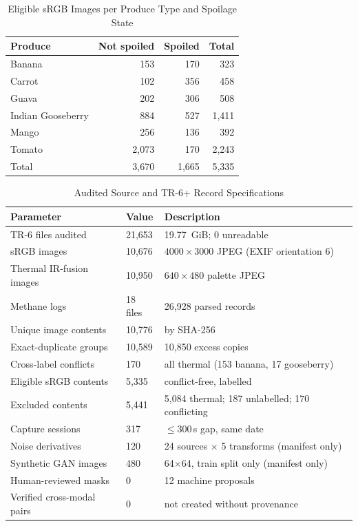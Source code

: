 \documentclass[journal]{IEEEtran}
\begin{document}
\begin{table}[!t]
\caption{Eligible sRGB Images per Produce Type and Spoilage State}
\label{tab:class}
\centering
\footnotesize
\begin{tabular}{@{}lrrr@{}}
\toprule
Produce & Not spoiled & Spoiled & Total \\
\midrule
Banana            &   153 & 170 &   323 \\
Carrot            &   102 & 356 &   458 \\
Guava             &   202 & 306 &   508 \\
Indian Gooseberry &   884 & 527 & 1,411 \\
Mango             &   256 & 136 &   392 \\
Tomato            & 2,073 & 170 & 2,243 \\
\midrule
Total             & 3,670 & 1,665 & 5,335 \\
\bottomrule
\end{tabular}
\end{table}

\begin{table}[!t]
\caption{Audited Source and TR-6+ Record Specifications}
\label{tab:spec}
\centering
\footnotesize
\begin{tabular}{@{}L{2.55cm}L{1.75cm}L{3.1cm}@{}}
\toprule
Parameter & Value & Description \\
\midrule
TR-6 files audited & 21,653 & 19.77~GiB; 0 unreadable \\
sRGB images & 10,676 & $4000\times3000$ JPEG (EXIF orientation 6) \\
Thermal IR-fusion images & 10,950 & $640\times480$ palette JPEG \\
Methane logs & 18 files & 26,928 parsed records \\
Unique image contents & 10,776 & by SHA-256 \\
Exact-duplicate groups & 10,589 & 10,850 excess copies \\
Cross-label conflicts & 170 & all thermal (153 banana, 17 gooseberry) \\
Eligible sRGB contents & 5,335 & conflict-free, labelled \\
Excluded contents & 5,441 & 5,084 thermal; 187 unlabelled; 170 conflicting \\
Capture sessions & 317 & $\le$300\,s gap, same date \\
Noise derivatives & 120 & 24 sources $\times$ 5 transforms (manifest only) \\
Synthetic GAN images & 480 & 64$\times$64, train split only (manifest only) \\
Human-reviewed masks & 0 & 12 machine proposals \\
Verified cross-modal pairs & 0 & not created without provenance \\
\bottomrule
\end{tabular}
\end{table}
\end{document}
